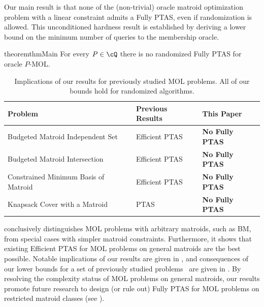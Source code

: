 Our main result is that none of the (non-trivial) 
oracle matroid optimization problem with a linear constraint admits 
a Fully PTAS, even if randomization is allowed. This unconditioned hardness result is established by deriving a lower bound on the minimum number of queries to the membership oracle. 
 \begin{restatable}{theorem}{thmMain}
	\label{thm:main}
	For every $P \in \cQ$ there is no randomized  \textnormal{Fully PTAS} for oracle $P$-\textnormal{MOL}. 
\end{restatable} 

\begin{table}[tbh]
	\centering
	\begin{tabular}{m{2.7in} m{1.4in} m{1.9in}}
		\toprule
		Problem & Previous Results & This Paper \\
		\midrule
		Budgeted Matroid Independent Set & Efficient PTAS \cite{DKS23} & {\bf No Fully PTAS} \\
		Budgeted Matroid Intersection & Efficient PTAS  \cite{DKS23b} & {\bf No Fully PTAS}  \\
		Constrained Minimum Basis of Matroid & Efficient PTAS  \cite{HL04} & {\bf No Fully PTAS} \\
		Knapsack Cover with a Matroid & PTAS \cite{CCNR13} & {\bf No Fully PTAS}  \\
		\bottomrule
	\end{tabular}
	\caption{Implications of our results for previously studied MOL problems. All of our bounds hold for randomized algorithms. }
	\label{tab:results}
\end{table}

 conclusively distinguishes MOL problems with arbitrary matroids, such as BM, from special cases with simpler matroid constraints. Furthermore, it shows that existing Efficient PTAS \cite{HL04,DKS23,DKS23b} for MOL problems on general matroids are the best possible. Notable implications of our results are given in , and consequences of our lower bounds for a set of previously studied problems~\cite{ CGM92,HL04,BBGS11,CVZ11,GZ10,CCNR13,DKS23,DKS23b,doron2023budgeted}
are given in . By resolving the complexity status of MOL problems on general matroids, our results promote future research to design (or rule out) Fully PTAS for MOL problems on restricted matroid classes (see ). 

